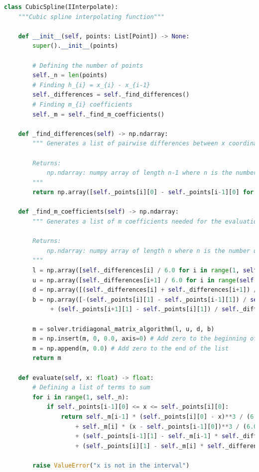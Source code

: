 \documentclass[12pt]{extarticle}
\begin{document}
\begin{lstlisting}[language=Python, caption=Реалізація кубічного сплайну]
class CubicSpline(IInterpolate):
    """Cubic spline interpolating function"""
    
    def __init__(self, points: List[Point]) -> None:
        super().__init__(points)
        
        # Defining the number of points
        self._n = len(points)
        # Finding h_{i} = x_{i} - x_{i-1}
        self._differences = self._find_differences()
        # Finding m_{i} coefficients
        self._m = self._find_m_coefficients()
        
    def _find_differences(self) -> np.ndarray:
        """ Generates a list of pairwise differences between x coordinates of points

        Returns:
            np.ndarray: numpy array of length n-1 where n is the number of points
        """
        return np.array([self._points[i][0] - self._points[i-1][0] for i in range(1, self._n)])
        
    def _find_m_coefficients(self) -> np.ndarray:
        """ Generates a list of m coefficients needed for the evaluation

        Returns:
            np.ndarray: numpy array of length n where n is the number of points
        """
        l = np.array([self._differences[i] / 6.0 for i in range(1, self._n-2)]) # Initializing the lower diagonal
        u = np.array([self._differences[i+1] / 6.0 for i in range(self._n-3)]) # Initializing the upper diagonal
        d = np.array([(self._differences[i] + self._differences[i+1]) / 3.0 for i in range(self._n-2)]) # Initializing the main diagonal
        b = np.array([-(self._points[i][1] - self._points[i-1][1]) / self._differences[i-1]
             + (self._points[i+1][1] - self._points[i][1]) / self._differences[i] for i in range(1, self._n-1)]) # Initializing the right hand side

        m = solver.tridiagonal_matrix_algorithm(l, u, d, b)
        m = np.insert(m, 0, 0.0, axis=0) # Add zero to the beginning of the list
        m = np.append(m, 0.0) # Add zero to the end of the list
        return m
     
    def evaluate(self, x: float) -> float:
        # Defining a list of terms to sum
        for i in range(1, self._n):
            if self._points[i-1][0] <= x <= self._points[i][0]:
                return self._m[i-1] * (self._points[i][0] - x)**3 / (6.0 * self._differences[i-1]) \
                    + self._m[i] * (x - self._points[i-1][0])**3 / (6.0 * self._differences[i-1]) \
                    + (self._points[i-1][1] - self._m[i-1] * self._differences[i-1]**2 / 6.0) * (self._points[i][0] - x) / self._differences[i-1] \
                    + (self._points[i][1] - self._m[i] * self._differences[i-1]**2 / 6.0) * (x - self._points[i-1][0]) / self._differences[i-1]
                    
        raise ValueError("x is not in the interval")
\end{lstlisting}
\end{document}
